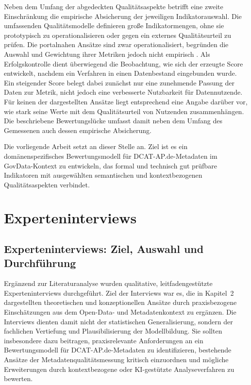 Neben dem Umfang der abgedeckten Qualitätsaspekte betrifft eine zweite Einschränkung die empirische Absicherung der jeweiligen Indikatorauswahl. Die umfassenden Qualitätsmodelle definieren große Indikatormengen, ohne sie prototypisch zu operationalisieren oder gegen ein externes Qualitätsurteil zu prüfen. Die portalnahen Ansätze sind zwar operationalisiert, begründen die Auswahl und Gewichtung ihrer Metriken jedoch nicht empirisch \cite{data_europa}. Als Erfolgskontrolle dient überwiegend die Beobachtung, wie sich der erzeugte Score entwickelt, nachdem ein Verfahren in einen Datenbestand eingebunden wurde. Ein steigender Score belegt dabei zunächst nur eine zunehmende Passung der Daten zur Metrik, nicht jedoch eine verbesserte Nutzbarkeit für Datennutzende. Für keinen der dargestellten Ansätze liegt entsprechend eine Angabe darüber vor, wie stark seine Werte mit dem Qualitätsurteil von Nutzenden zusammenhängen. Die beschriebene Bewertungslücke umfasst damit neben dem Umfang des Gemessenen auch dessen empirische Absicherung.

Die vorliegende Arbeit setzt an dieser Stelle an. Ziel ist es ein domänenspezifisches Bewertungsmodell für DCAT-AP.de-Metadaten im GovData-Kontext zu entwickeln, das formal und technisch gut prüfbare Indikatoren mit ausgewählten semantischen und kontextbezogenen Qualitätsaspekten verbindet.

\pagebreak

\chapter{Experteninterviews}
\label{sec:chapter_03}


\section{Experteninterviews: Ziel, Auswahl und Durchführung}
\label{sec:interviews_ziel_auswahl}

Ergänzend zur Literaturanalyse wurden qualitative, leitfadengestützte Experteninterviews durchgeführt. Ziel der Interviews war es, die in Kapitel~2 dargestellten theoretischen und konzeptionellen Ansätze durch praxisbezogene Einschätzungen aus dem Open-Data- und Metadatenkontext zu ergänzen. Die Interviews dienten damit nicht der statistischen Generalisierung, sondern der fachlichen Vertiefung und Plausibilisierung der Modellbildung. Sie sollten insbesondere dazu beitragen, praxisrelevante Anforderungen an ein Bewertungsmodell für DCAT-AP.de-Metadaten zu identifizieren, bestehende Ansätze der Metadatenqualitätsmessung kritisch einzuordnen und mögliche Erweiterungen durch kontextbezogene oder KI-gestützte Analyseverfahren zu bewerten.

